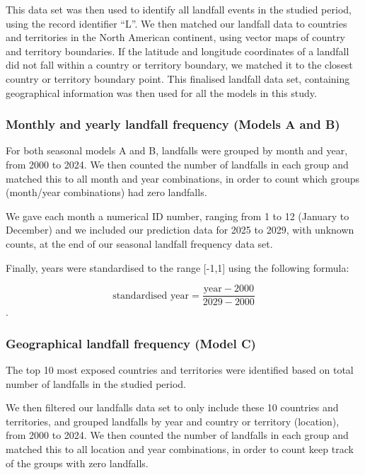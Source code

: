 \documentclass[
]{article}
\begin{document}
This data set was then used to identify all landfall events in the studied period, using the record identifier ``L''. We then matched our landfall data to countries and territories in the North American continent, using vector maps of country and territory boundaries. If the latitude and longitude coordinates of a landfall did not fall within a country or territory boundary, we matched it to the closest country or territory boundary point. This finalised landfall data set, containing geographical information was then used for all the models in this study.

\subsubsection{Monthly and yearly landfall frequency (Models A and B)}\label{monthly-and-yearly-landfall-frequency-models-a-and-b}

For both seasonal models A and B, landfalls were grouped by month and year, from 2000 to 2024.
We then counted the number of landfalls in each group and matched this to all month and year combinations, in order to count which groups (month/year combinations) had zero landfalls.

We gave each month a numerical ID number, ranging from 1 to 12 (January to December) and we included our prediction data for 2025 to 2029, with unknown counts, at the end of our seasonal landfall frequency data set.

Finally, years were standardised to the range {[}-1,1{]} using the following formula:

\[\text{standardised year} = \frac{\text{year} - 2000}{2029 - 2000}\].

\subsubsection{Geographical landfall frequency (Model C)}\label{geographical-landfall-frequency-model-c}

The top 10 most exposed countries and territories were identified based on total number of landfalls in the studied period.

We then filtered our landfalls data set to only include these 10 countries and territories, and grouped landfalls by year and country or territory (location), from 2000 to 2024.
We then counted the number of landfalls in each group and matched this to all location and year combinations, in order to count keep track of the groups with zero landfalls.
\end{document}
